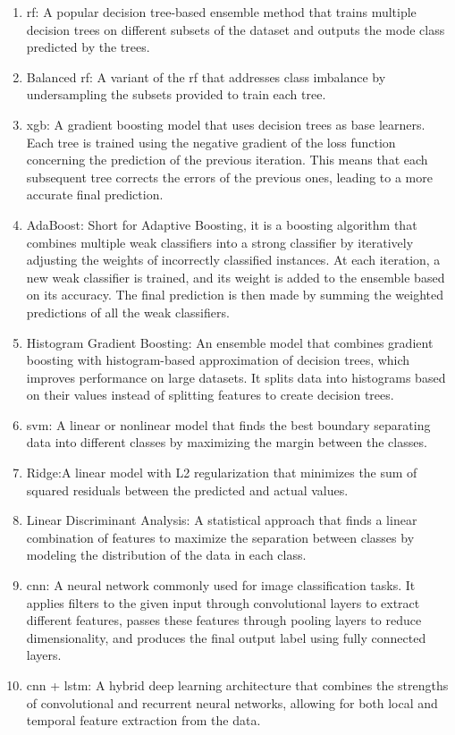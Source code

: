 \begin{enumerate}[resume]
	\item \ac{rf}: A popular decision tree-based ensemble method that trains multiple decision trees on different subsets of the dataset and outputs the mode class predicted by the trees.
	
	\item Balanced \ac{rf}: A variant of the \ac{rf} that addresses class imbalance by undersampling the subsets provided to train each tree.
	
	\item \ac{xgb}: A gradient boosting model that uses decision trees as base learners. Each tree is trained using the negative gradient of the loss function concerning the prediction of the previous iteration. This means that each subsequent tree corrects the errors of the previous ones, leading to a more accurate final prediction.
	
	\item AdaBoost: Short for Adaptive Boosting, it is a boosting algorithm that combines multiple weak classifiers into a strong classifier by iteratively adjusting the weights of incorrectly classified instances. At each iteration, a new weak classifier is trained, and its weight is added to the ensemble based on its accuracy. The final prediction is then made by summing the weighted predictions of all the weak classifiers.
	
	\item Histogram Gradient Boosting: An ensemble model that combines gradient boosting with histogram-based approximation of decision trees, which improves performance on large datasets. It splits data into histograms based on their values instead of splitting features to create decision trees.
	
	\item \ac{svm}: A linear or nonlinear model that finds the best boundary separating data into different classes by maximizing the margin between the classes.
	
	\item Ridge:A linear model with L2 regularization that minimizes the sum of squared residuals between the predicted and actual values.
	
	\item Linear Discriminant Analysis: A statistical approach that finds a linear combination of features to maximize the separation between classes by modeling the distribution of the data in each class.
	
	\item \ac{cnn}: A neural network commonly used for image classification tasks. It applies filters to the given input through convolutional layers to extract different features, passes these features through pooling layers to reduce dimensionality, and produces the final output label using fully connected layers.
	
	\item \ac{cnn} + \ac{lstm}: A hybrid deep learning architecture that combines the strengths of convolutional and recurrent neural networks, allowing for both local and temporal feature extraction from the data.
\end{enumerate}



